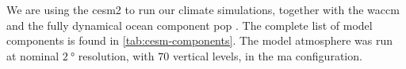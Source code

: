 \documentclass{ametsocV5}
\begin{document}
We are using the \acrfull{cesm2} \citep{danabasoglu2020} to run our climate simulations,
together with the \acrfull{waccm} \citep{gettleman2019} and the fully dynamical ocean
component \acrfull{pop} \citep{smith2010, danabasoglu2020}. The complete list of model
components is found in \cref{tab:cesm-components}. The model atmosphere was run at
nominal \(\SI{2}{\degree}\) resolution, with \(70\) vertical levels, in the \acrfull{ma}
configuration.

\end{document}
